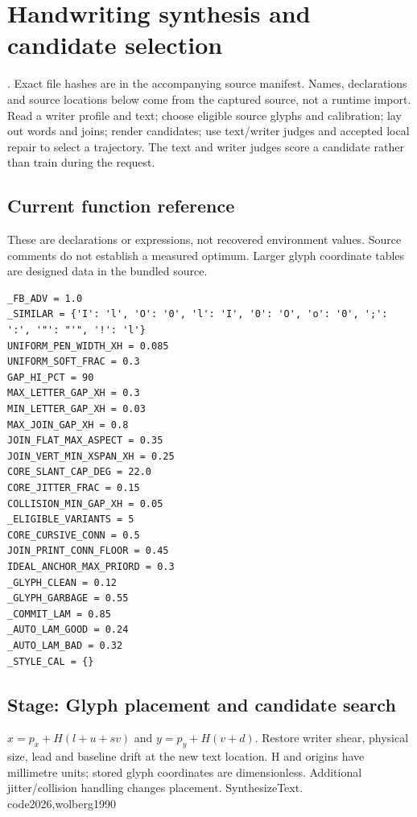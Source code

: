 \chapter{Handwriting synthesis and candidate selection}\label{module:synthesise}
. Exact file hashes are in the accompanying source manifest. Names, declarations and source locations below come from the captured source, not a runtime import.
Read a writer profile and text; choose eligible source glyphs and calibration; lay out words and joins; render candidates; use text/writer judges and accepted local repair to select a trajectory. The text and writer judges score a candidate rather than train during the request.



\section*{Current function reference}
These are declarations or expressions, not recovered environment values. Source comments do not establish a measured optimum. Larger glyph coordinate tables are designed data in the bundled source.
\begin{lstlisting}[style=plain]
_FB_ADV = 1.0
_SIMILAR = {'I': 'l', 'O': '0', 'l': 'I', '0': 'O', 'o': '0', ';': ':', '"': "'", '!': 'l'}
UNIFORM_PEN_WIDTH_XH = 0.085
UNIFORM_SOFT_FRAC = 0.3
GAP_HI_PCT = 90
MAX_LETTER_GAP_XH = 0.3
MIN_LETTER_GAP_XH = 0.03
MAX_JOIN_GAP_XH = 0.8
JOIN_FLAT_MAX_ASPECT = 0.35
JOIN_VERT_MIN_XSPAN_XH = 0.25
CORE_SLANT_CAP_DEG = 22.0
CORE_JITTER_FRAC = 0.15
COLLISION_MIN_GAP_XH = 0.05
_ELIGIBLE_VARIANTS = 5
CORE_CURSIVE_CONN = 0.5
JOIN_PRINT_CONN_FLOOR = 0.45
IDEAL_ANCHOR_MAX_PRIORD = 0.3
_GLYPH_CLEAN = 0.12
_GLYPH_GARBAGE = 0.55
_COMMIT_LAM = 0.85
_AUTO_LAM_GOOD = 0.24
_AUTO_LAM_BAD = 0.32
_STYLE_CAL = {}
\end{lstlisting}
\section*{Stage: Glyph placement and candidate search}
{$x=p_x+H(l+u+sv)$ and $y=p_y+H(v+d)$.}
{Restore writer shear, physical size, lead and baseline drift at the new
text location. H and origins have millimetre units; stored glyph coordinates
are dimensionless. Additional jitter/collision handling changes placement.}
{SynthesizeText.}
{code2026,wolberg1990}

